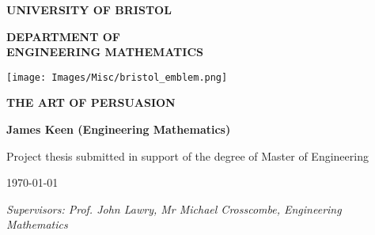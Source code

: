 \begin{titlepage}

\vspace*{1cm}

\begin{center}
    \textbf{\LARGE UNIVERSITY OF BRISTOL}
    
    \vspace{3em}
    
    \textbf{\Huge DEPARTMENT OF \\ \vspace{0.5em} ENGINEERING MATHEMATICS}
    
\end{center}
\vspace{3cm}

\center
\texttt{[image: Images/Misc/bristol\_emblem.png]}\par\vspace{1cm}

\vspace{2.5cm}

{ \huge \bfseries THE ART OF PERSUASION
}\\

\vspace{3cm}

{ \large \bfseries James Keen (Engineering Mathematics)
}\\

\vspace{2cm}

{\large Project thesis submitted in support of the degree of Master of Engineering}

\vspace{0.7cm}

\today

\vspace{0.25em}


\raggedright \textit{Supervisors: Prof. John Lawry, Mr Michael Crosscombe,  Engineering Mathematics}

\end{titlepage}
